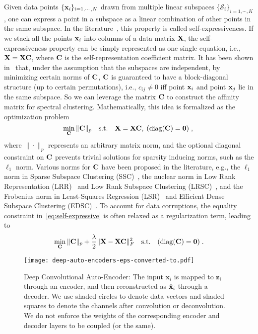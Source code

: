 \documentclass{article}
\begin{document}
Given data points $\{{\bf x}_i\}_{i = 1,\cdots,N}$ drawn from multiple linear subspaces $\{\mathcal{S}_i\}_{i = 1,\cdots,K}$, one can express a point in a subspace as a linear combination of other points in the same subspace. In the literature~\cite{rao2008motion,elhamifar2009sparse}, this property is called self-expressiveness. If we stack all the points ${\bf x}_i$ into columns of a data matrix ${\bf X}$, the self-expressiveness property can be simply represented as one single equation, i.e., ${\bf X} = {\bf X}{\bf C}$, where ${\bf C}$ is the self-representation coefficient matrix. It has been shown in~\cite{ji2014efficient} that, under the assumption that the subspaces are independent, by minimizing certain norms of ${\bf C}$, ${\bf C}$ is guaranteed to have a block-diagonal structure (up to certain permutations), i.e., $c_{ij} \neq 0$ iff point ${\bf x}_i$ and point ${\bf x}_j$ lie in the same subspace. So we can leverage the matrix ${\bf C}$ to construct the affinity matrix for spectral clustering. Mathematically, this idea is formalized as the optimization problem
\begin{equation}
\label{eq:self-expressive}
\min\limits_{\bf C} \|{\bf C}\|_p \quad {\rm s.t.} \quad {\bf X} = {\bf X}{\bf C},\; ({\rm diag}({\bf C}) = {\bf 0})\;,\;
\end{equation}
where $\|\cdot\|_p$ represents an arbitrary matrix norm, and the optional diagonal constraint on ${\bf C}$ prevents trivial solutions for sparsity inducing norms, such as the $\ell_1$ norm. Various norms for ${\bf C}$ have been proposed in the literature, e.g., the $\ell_1$ norm in Sparse Subspace Clustering (SSC)~\cite{elhamifar2009sparse,elhamifar2013sparse}, the nuclear norm in Low Rank Representation (LRR)~\cite{liu2010robust,liu2013robust} and Low Rank Subspace Clustering (LRSC)~\cite{favaro2011closed,vidal2014low}, and the Frobenius norm in Least-Squares Regression (LSR)~\cite{lu2012robust} and Efficient Dense Subspace Clustering (EDSC)~\cite{ji2014efficient}. To account for data corruptions, the equality constraint in~\eqref{eq:self-expressive} is often relaxed as a regularization term, leading to
\begin{equation}
\min\limits_{\bf C} \|{\bf C}\|_p + \frac{\lambda}{2}\|{\bf X} - {\bf X}{\bf C}\|_F^2\quad {\rm s.t.}\quad  ({\rm diag}({\bf C}) = {\bf 0})\;.
\end{equation}

\begin{figure}[!t]
\centering
\hspace{-0.1cm}\texttt{[image: deep-auto-encoders-eps-converted-to.pdf]}
\caption{Deep Convolutional Auto-Encoder: The input ${\mathbf{x} }_i$ is mapped to ${\mathbf{z}}_i$ through an encoder, and then reconstructed as $\hat{\bf x}_i$ through a decoder. We use shaded circles to denote data vectors and shaded squares to denote the channels after convolution or deconvolution. We do not enforce the weights of the corresponding encoder and decoder layers to be coupled (or the same).}\label{fig:dae}
\vspace{-0.3cm}
\end{figure}
\end{document}
